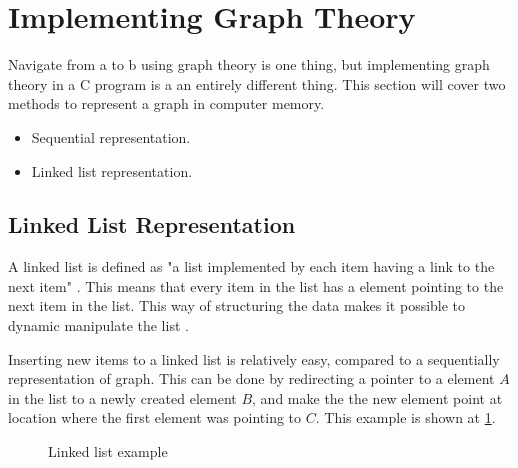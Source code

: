 \section{Implementing Graph Theory}

Navigate from a to b using graph theory is one thing, but implementing graph theory in a C program is a an entirely different thing. This section will cover two methods to represent a graph in computer memory. 

\begin{itemize}
	\item Sequential representation.
	\item Linked list representation.
\end{itemize} 


\subsection{Linked List Representation}
\label{sub:list}
A linked list is defined as "a list implemented by each item having a link to the next item" \cite{linked_list_def}.
This means that every item in the list has a element pointing to the next item in the list. This way of structuring the data makes it possible to dynamic manipulate the list \cite{Linked_List}.

Inserting new items to a linked list is relatively easy, compared to a sequentially representation of graph. 
This can be done by redirecting a pointer to a element $A$ in the list to a newly created element $B$, and make the the new element point at location where the first element was pointing to $C$. This example is shown at \cref{fig:link}.

\begin{figure}[h]
 \centering
{}
\caption{Linked list example} \label{fig:link}
\end{figure}

